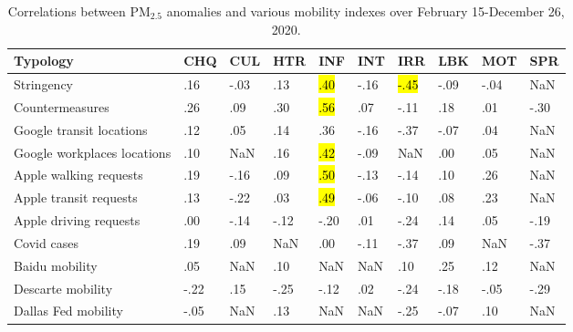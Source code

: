 \documentclass[preprint,12pt]{elsarticle}
\newcommand{\hly}[2][yellow]{{
  \colorlet{foo}{#1}
  \sethlcolor{foo}\hl{#2}}
}
\newcommand{\hlb}[2][brown]{{
  \colorlet{foo}{#1}
  \sethlcolor{foo}\hl{#2}}
}
\newcommand{\hlgr}[2][lightgray]{{
  \colorlet{foo}{#1}
  \sethlcolor{foo}\hl{#2}}
}
\begin{document}
\begin{table}[!ht]
\caption{\label{tab:pm25corr1} Correlations between PM$_{2.5}$ anomalies and various mobility indexes over February 15-December 26, 2020.}
    \centering
    \begin{tabular}{|l|p{0.75cm}|p{0.75cm}|p{0.75cm}|p{0.75cm}|p{0.75cm}|p{0.75cm}|p{0.75cm}|p{0.75cm}|p{0.75cm}|}
    \hline
    Typology & CHQ & CUL & HTR & INF & INT & IRR & LBK & MOT & SPR \\ \hline
    Stringency & .16 & -.03 & .13 & \hlgr{.40} & -.16 & \hlb{-.45} & -.09 & -.04 & NaN \\ \hline
    Countermeasures & .26 & .09 & .30 & \hly{.56} & .07 & -.11 & .18 & .01 & -.30 \\ \hline
    Google transit locations & .12 & .05 & .14 & .36 & -.16 & -.37 & -.07 & .04 & NaN \\ \hline
    Google workplaces locations & .10 & NaN & .16 & \hlgr{.42} & -.09 & NaN & .00 & .05 & NaN \\ \hline
    Apple walking requests & .19 & -.16 & .09 & \hly{.50} & -.13 & -.14 & .10 & .26 & NaN \\ \hline
    Apple transit requests & .13 & -.22 & .03 & \hlgr{.49} & -.06 & -.10 & .08 & .23 & NaN \\ \hline
    Apple driving requests & .00 & -.14 & -.12 & -.20 & .01 & -.24 & .14 & .05 & -.19 \\ \hline
    Covid cases & .19 & .09 & NaN & .00 & -.11 & -.37 & .09 & NaN & -.37 \\ \hline
    Baidu mobility & .05 & NaN & .10 & NaN & NaN & .10 & .25 & .12 & NaN \\ \hline
    Descarte mobility & -.22 & .15 & -.25 & -.12 & .02 & -.24 & -.18 & -.05 & -.29 \\ \hline
    Dallas Fed mobility & -.05 & NaN & .13 & NaN & NaN & -.25 & -.07 & .10 & NaN \\ \hline
    \end{tabular}
\end{table}
\end{document}
